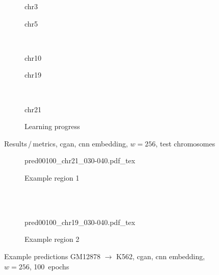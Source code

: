 \begin{figure}[p] %
    \begin{subfigure}{0.45\textwidth}
        \scriptsize
        \caption{chr3}
    \end{subfigure} \hfill
    \begin{subfigure}{0.45\textwidth}
        \scriptsize
        \caption{chr5}
    \end{subfigure}\\[5mm]
    \begin{subfigure}{0.45\textwidth}
        \scriptsize
        \caption{chr10}
    \end{subfigure}\hfill
    \begin{subfigure}{0.45\textwidth}
        \scriptsize
        \caption{chr19}
    \end{subfigure}\\[3mm]
    \centering
    \begin{subfigure}{0.45\textwidth}
        \scriptsize
        \caption{chr21}
    \end{subfigure} \hfill
    \begin{subfigure}{0.45\textwidth}
        \scriptsize
        \caption{Learning progress} \label{fig:results:cGAN256_lossEpochs}
    \end{subfigure}
    \caption{Results\,/\,metrics, \acrshort{cgan}, \acrshort{cnn} embedding, $w=256$, test chromosomes}   \label{fig:results:cGAN256_pearson}
\end{figure}
\begin{figure}[p] %
    \begin{subfigure}{\textwidth}
        \centering
        \scriptsize
        {pred00100_chr21_030-040.pdf_tex}
        \caption{Example  region 1} \label{fig:results:cGAN256_r1}
    \end{subfigure}\\[2mm]
    \\[3mm]
    \begin{subfigure}{\textwidth}
        \centering
        \scriptsize
        {pred00100_chr19_030-040.pdf_tex}
        \caption{Example region 2} \label{fig:results:cGAN256_r2}
    \end{subfigure}
    \caption{Example predictions GM12878 $\rightarrow$ K562, \acrshort{cgan}, \acrshort{cnn} embedding, $w=256$, 100~epochs}
\end{figure}

